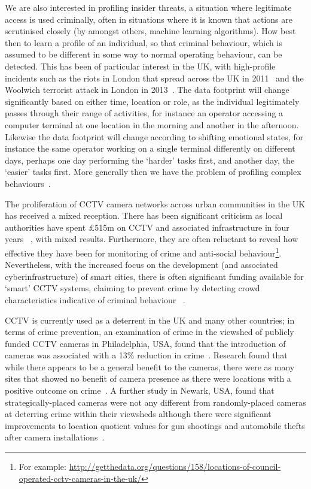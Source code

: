 \documentclass[conference]{IEEEtran}
\begin{document}
We are also interested in profiling insider threats, a situation where
legitimate access is used criminally, often in situations where it is
known that actions are scrutinised closely (by amongst others, machine
learning algorithms). How best then to learn a profile of an
individual, so that criminal behaviour, which is assumed to be
different in some way to normal operating behaviour, can be
detected. This has been of particular interest in the UK, with
high-profile incidents such as the riots in London that spread across
the UK in 2011~\cite{procter-et-al:2013} and the Woolwich terrorist
attack in London in 2013~\cite{burnap-et-al:2014}. The data footprint
will change significantly based on either time, location or role, as
the individual legitimately passes through their range of activities,
for instance an operator accessing a computer terminal at one location
in the morning and another in the afternoon. Likewise the data
footprint will change according to shifting emotional states, for
instance the same operator working on a single terminal differently on
different days, perhaps one day performing the `harder' tasks first,
and another day, the `easier' tasks first. More generally then we have
the problem of profiling complex behaviours~\cite{oatley+crick:2014}.

The proliferation of CCTV camera networks across urban communities in
the UK has received a mixed reception. There has been significant
criticism as local authorities have spent \pounds515m on CCTV and
associated infrastructure in four years ~\cite{bbw:2012}, with mixed
results. Furthermore, they are often reluctant to reveal how effective
they have been for monitoring of crime and anti-social
behaviour\footnote{For example:
\url{http://getthedata.org/questions/158/locations-of-council-operated-cctv-cameras-in-the-uk/}}.
Nevertheless, with the increased focus on the development (and
associated cyberinfrastructure) of smart cities, there is often
significant funding available for `smart' CCTV systems, claiming to
prevent crime by detecting crowd characteristics indicative of
criminal behaviour ~\cite{welsh+farrington:2009,dibella-et-al:2014}.

CCTV is currently used as a deterrent in the UK and many other
countries; in terms of crime prevention, an examination of crime in
the viewshed of publicly funded CCTV cameras in Philadelphia, USA,
found that the introduction of cameras was associated with a 13\%
reduction in crime~\cite{ratcliffe+taniguchi:2008}. Research found
that while there appears to be a general benefit to the cameras, there
were as many sites that showed no benefit of camera presence as there
were locations with a positive outcome on
crime~\cite{ratcliffe-et-al:2009}.  A further study in Newark, USA,
found that strategically-placed cameras were not any different from
randomly-placed cameras at deterring crime within their viewsheds
although there were significant improvements to location quotient
values for gun shootings and automobile thefts after camera
installations~\cite{caplan-et-al:2011}.
\end{document}

